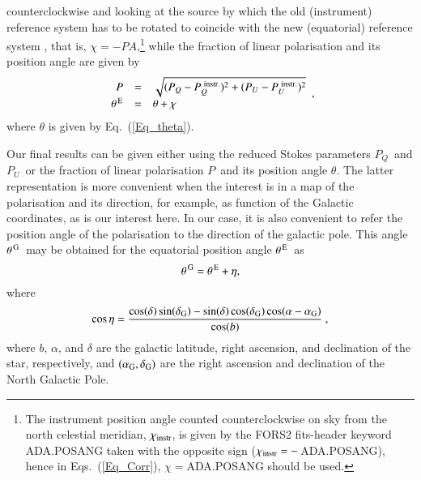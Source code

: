 \documentclass[a4paper]{aa}
\newcommand{\pq}{\ensuremath{P_Q}}
\newcommand{\pu}{\ensuremath{P_U}}
\newcommand{\pl}{\ensuremath{P}}
\newcommand{\thetae}{\ensuremath{\theta^{\rm \,E}}}
\newcommand{\thetaG}{\ensuremath{\theta^{\rm \,G}}}
\begin{document}
counterclockwise and looking at the source by which the old
(instrument) reference system has to be rotated to coincide with the
new (equatorial) reference system \citep[e.g.][]{Lanetal07}, that is,
$\chi = -PA$,\footnote{The instrument position angle counted
  counterclockwise on sky from the north celestial meridian,
  $\chi_{\rm instr}$, is given by the FORS2 fits-header keyword
  ADA.POSANG taken with the opposite sign ($\chi_{\rm instr} =
  -$\,ADA.POSANG), hence in Eqs.~(\ref{Eq_Corr}),  $\chi
  = $ADA.POSANG should be used.} while the fraction of linear polarisation and its
position angle are given by
\begin{equation}
  \begin{array}{rcl}
  \pl &=& \sqrt{(\pq - \pq^{\rm \ instr.})^2 + (\pu - \pu^{\rm \ instr.})^2} \\
  \thetae &=& \theta + \chi \\
\end{array}
  ,\end{equation}
where $\theta$ is given by Eq.~(\ref{Eq_theta}). 

Our final results can be given either using the reduced Stokes
parameters \pq\ and \pu\ or the fraction of linear polarisation
\pl\ and its position angle $\theta$. The latter representation is more
convenient when the interest is in a map of the polarisation and its
direction, for example, as function of the Galactic coordinates, as is our interest here.
In our case, it is also
convenient to refer the position angle of the polarisation to the
direction of the galactic pole. This angle \thetaG\ may be obtained
for the equatorial position angle \thetae\ as
\begin{equation}
  \thetaG = \thetae + \eta
,\end{equation}
where
\begin{equation}
  \cos \eta = 
  \frac{\cos(\delta) \sin(\delta_{\rm G}) -
                 \sin(\delta) \cos(\delta_{\rm G}) \cos(\alpha-\alpha_{\rm G})}{\cos(b)} \ ,
\end{equation}
where $b$, $\alpha$, and $\delta$ are the galactic latitude, right
ascension, and declination of the star, respectively, and $(\alpha_{\rm
  G},\delta_{\rm G})$ are the right ascension
and declination of the North Galactic Pole.
\end{document}

